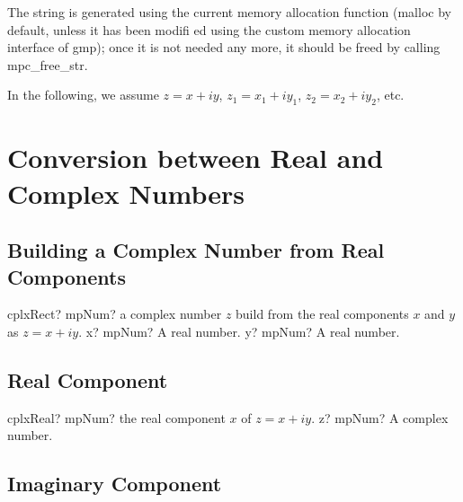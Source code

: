 The string is generated using the current memory allocation function (malloc by default,
unless it has been modifi ed using the custom memory allocation interface of gmp); once it is
not needed any more, it should be freed by calling mpc\_free\_str.




\label{FunctionsReturningComplexNumbers} 

In the following, we assume $z=x+iy$, $z_1=x_1+iy_1$, $z_2=x_2+iy_2$, etc.



\section{Conversion between Real and Complex Numbers}


\subsection{Building a Complex Number from Real Components}

\begin{mpFunctionsExtract}
	\mpFunctionTwo
	{cplxRect? mpNum? a complex number $z$ build from the real components $x$ and $y$ as $z=x+iy$.}
	{x? mpNum? A real number.}
	{y? mpNum? A real number.}
\end{mpFunctionsExtract}

\vspace{0.6cm}



\newpage
\subsection{Real Component}

\begin{mpFunctionsExtract}
	\mpFunctionOne
	{cplxReal? mpNum? the real component $x$ of $z=x+iy$.}
	{z? mpNum? A complex number.}
\end{mpFunctionsExtract}





\subsection{Imaginary Component}

